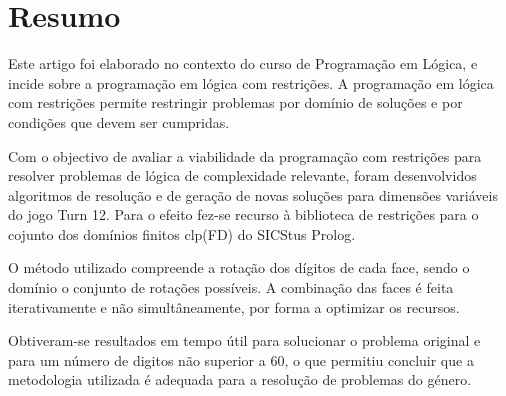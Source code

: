 %
%
%

\chapter{Resumo}
\label{abstract} %

Este artigo foi elaborado no contexto do curso de Programação em Lógica, e incide sobre a programação em lógica com restrições. 
A programação em lógica com restrições permite restringir problemas por domínio de soluções e por condições que devem ser cumpridas. 

Com o objectivo de avaliar a viabilidade da programação com restrições para resolver problemas de lógica de complexidade relevante, foram desenvolvidos algoritmos de resolução e de geração de novas soluções para dimensões variáveis do jogo Turn 12.
Para o efeito fez-se recurso à biblioteca de restrições para o cojunto dos domínios finitos clp(FD) do SICStus Prolog.

O método utilizado compreende a rotação dos dígitos de cada face, sendo o domínio o conjunto de rotações possíveis. A combinação das faces é feita iterativamente e não simultâneamente, por forma a optimizar os recursos.

Obtiveram-se resultados em tempo útil para solucionar o problema original e para um número de digitos não superior a 60, o que permitiu concluir que a metodologia utilizada é adequada para a resolução de problemas do género.
